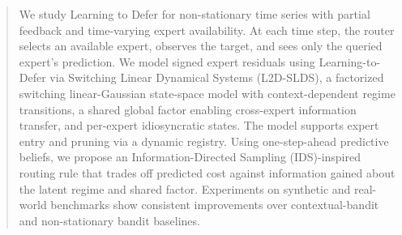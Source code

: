 \documentclass{article}
\begin{document}
\printAffiliationsAndNotice{}  %

\begin{abstract}
We study Learning to Defer for non-stationary time series with partial
feedback and time-varying expert availability. At each time step, the router selects an available expert,
observes the target, and sees only the queried expert's prediction. We model signed expert residuals
using Learning-to-Defer via Switching Linear Dynamical Systems (L2D-SLDS), a factorized switching linear-Gaussian state-space model with
context-dependent regime transitions, a shared global factor enabling cross-expert information
transfer, and per-expert idiosyncratic states. The model supports expert entry and pruning via a
dynamic registry. Using one-step-ahead predictive beliefs, we propose an Information-Directed Sampling (IDS)-inspired routing rule
that trades off predicted cost against information gained about the latent regime and shared factor.
Experiments on synthetic and real-world benchmarks show consistent improvements over contextual-bandit and non-stationary bandit baselines.
\end{abstract}












\end{document}
